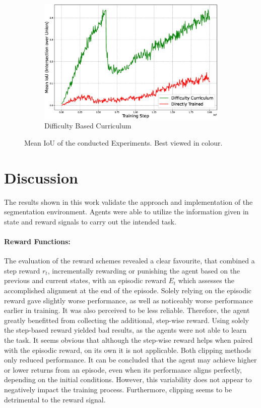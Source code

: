 \documentclass[11pt]{article} %
\begin{document}
\begin{figure}[h!]
\begin{subfigure}[b]{0.3\textwidth}
        \includegraphics[width=\textwidth]{figures/plot_diff_curr_high_res.eps}
        \caption{Difficulty Based Curriculum}
        \label{fig:diff-curr}
    \end{subfigure}
    \caption{Mean IoU of the conducted Experiments. Best viewed in colour.}
    \label{fig:curr_plots}
\end{figure}
\section{Discussion}
The results shown in this work validate the approach and implementation of the segmentation environment.
Agents were able to utilize the information given in state and reward signals to carry out the intended task.

\paragraph{Reward Functions:}
The evaluation of the reward schemes revealed a clear favourite, that combined a step reward $r_t$, incrementally rewarding or punishing the agent based on the previous and current states, with an episodic reward $E_t$ which assesses the accomplished alignment at the end of the episode.
Solely relying on the episodic reward gave slightly worse performance, as well as noticeably worse performance earlier in training.
It was also perceived to be less reliable.
Therefore, the agent greatly benefitted from collecting the additional, step-wise reward.
Using solely the step-based reward yielded bad results, as the agents were not able to learn the task.
It seems obvious that although the step-wise reward helps when paired with the episodic reward, on its own it is not applicable.
Both clipping methods only reduced performance.
It can be concluded that the agent may achieve higher or lower returns from an episode, even when its performance aligns perfectly, depending on the initial conditions.
However, this variability does not appear to negatively impact the training process.
Furthermore, clipping seems to be detrimental to the reward signal.
\end{document}
